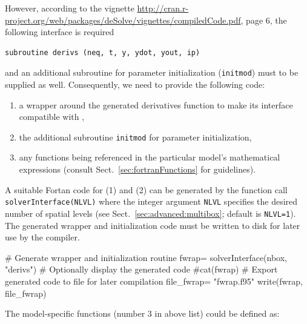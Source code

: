 \documentclass[times,onecolumn]{article}
\begin{document}
However, according to the  vignette \url{http://cran.r-project.org/web/packages/deSolve/vignettes/compiledCode.pdf}, page 6, the following interface is required

\begin{verbatim}
subroutine derivs (neq, t, y, ydot, yout, ip)
\end{verbatim}

and an additional subroutine for parameter initialization (\verb|initmod|) must to be supplied as well. Consequently, we need to provide the following  code:

\begin{enumerate}
\item a wrapper around the generated derivatives function to make its interface compatible with ,
\item the additional subroutine \verb|initmod| for parameter initialization,
\item any functions being referenced in the particular model's mathematical expressions (consult Sect.~\ref{sec:fortranFunctions} for guidelines).
\end{enumerate}

A suitable Fortan code for (1) and (2) can be generated by the function call \verb|solverInterface(NLVL)| where the integer argument \verb|NLVL| specifies the desired number of spatial levels (see Sect.~\ref{sec:advanced:multibox}; default is \verb|NLVL=1|). The generated wrapper and initialization code must be written to disk for later use by the compiler.

\begin{Schunk}
\begin{Sinput}
 # Generate wrapper and initialization routine
 fwrap= solverInterface(nbox, "derivs")
 # Optionally display the generated code
 #cat(fwrap)
 # Export generated code to file for later compilation
 file_fwrap= "fwrap.f95"
 write(fwrap, file_fwrap)
\end{Sinput}
\end{Schunk}

The model-specific functions (number 3 in above list) could be defined as:
\end{document}
